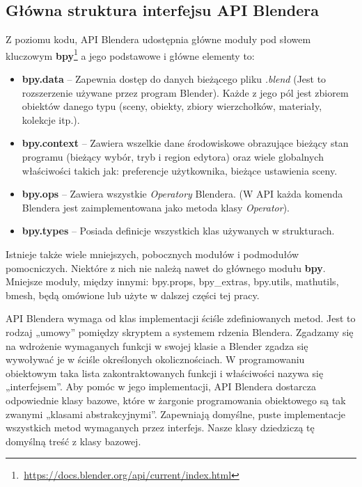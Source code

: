 \documentclass{xmgr}
\begin{document}
\subsection{Główna struktura interfejsu API Blendera}
Z poziomu kodu, API Blendera udostępnia główne moduły pod słowem kluczowym \textbf{bpy}\footnote{\,\url{https://docs.blender.org/api/current/index.html}} a jego podstawowe i główne elementy to:
\begin{itemize}
\item \textbf{bpy.data} -- Zapewnia dostęp do danych bieżącego pliku \emph{.blend} (Jest to rozszerzenie używane przez program Blender). Każde z jego pól jest zbiorem obiektów danego typu (sceny, obiekty, zbiory wierzchołków, materiały, kolekcje itp.).
\item \textbf{bpy.context} -- Zawiera wszelkie dane środowiskowe obrazujące bieżący stan programu (bieżący wybór, tryb i region edytora) oraz wiele globalnych właściwości takich jak: preferencje użytkownika, bieżące ustawienia sceny.
\item \textbf{bpy.ops} -- Zawiera wszystkie \emph{Operatory} Blendera. (W API każda komenda Blendera jest zaimplementowana jako metoda klasy \emph{Operator}).
\item \textbf{bpy.types} -- Posiada definicje wszystkich klas używanych w strukturach.
\end{itemize}
\newpage
Istnieje także wiele mniejszych, pobocznych modułów i podmodułów pomocniczych. Niektóre z nich nie należą nawet do głównego modułu \textbf{bpy}. Mniejsze moduły, między innymi: bpy.props, bpy\_extras, bpy.utils, mathutils, bmesh, będą omówione lub użyte w dalszej części tej pracy.

API Blendera wymaga od klas implementacji ściśle zdefiniowanych metod. Jest to rodzaj „umowy” pomiędzy skryptem a systemem rdzenia Blendera. Zgadzamy się na wdrożenie wymaganych funkcji w swojej klasie a Blender zgadza się wywoływać je w ściśle określonych okolicznościach. W programowaniu obiektowym taka lista zakontraktowanych funkcji i właściwości nazywa się „interfejsem”. Aby pomóc w jego implementacji, API Blendera dostarcza odpowiednie klasy bazowe, które w żargonie programowania obiektowego są tak zwanymi „klasami abstrakcyjnymi”. Zapewniają domyślne, puste implementacje wszystkich metod wymaganych przez interfejs. Nasze klasy dziedziczą tę domyślną treść z klasy bazowej.
\end{document}
